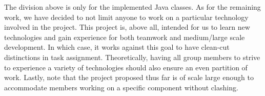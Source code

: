 \documentclass[a4paper, 12pt]{article}
\begin{document}
    The division above is only for the implemented Java classes.
    As for the remaining work, we have decided to not limit anyone to work on a particular technology
    involved in the project. This project is, above all, intended for us to learn new technologies
    and gain experience for both teamwork and medium/large scale development. In which case, it works
    against this goal to have clean-cut distinctions in task assignment.
    Theoretically, having all group members to strive to experience a variety of technologies should also ensure an even
    partition of work. Lastly, note that the project proposed thus far is of scale large enough to accommodate
    members working on a specific component without clashing.
\end{document}
